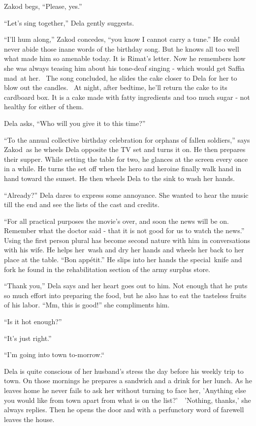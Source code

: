 \documentclass[twoside,11pt]{book}
\begin{document}
Zakod begs, ``Please, yes.'' 

``Let's sing together,'' Dela gently suggests. 

``I'll hum along,'' Zakod concedes, ``you know I cannot carry a
tune.'' He could never abide those inane words of the birthday song. But he knows all too well what made
him so amenable today. It is Rimat's letter. Now he remembers how she was always teasing him about his tone-deaf
singing - which would get Saffia mad\ at her. \ The song concluded, he slides the cake closer to Dela for her to blow
out the candles. \ At night, after bedtime, he'll return the cake to its cardboard box. It is a cake made with fatty
ingredients and too much sugar - not healthy for either of them.

Dela asks, ``Who will you give it to this time?'' 

``To the annual collective birthday celebration for orphans of fallen soldiers,'' says
Zakod~as he wheels Dela opposite the TV set and turns it on. He then prepares their supper. While setting the table for
two, he glances at the screen every once in a while. He turns the set off when the hero and heroine finally walk hand
in hand toward the sunset. He then wheels Dela to the sink to wash her hands.\ \ 

``Already?'' Dela dares to express some annoyance. She wanted to hear the music till the end
and see the lists of the cast and credits. 

``For all practical purposes the movie's over, and soon the news will be on. Remember what the doctor said
- that it is not good for us to watch the news.'' Using the first person plural has become second nature
with him in conversations with his wife. He helps her~wash and dry her hands and wheels her back to her place at the
table. ``Bon app\'etit.'' He slips into her hands the special~knife and fork he found in the
rehabilitation section of the army surplus store. 

``Thank you,'' Dela says and her heart goes out to him. Not enough that he puts so much effort
into preparing the food, but he also has to eat the tasteless fruits of his labor. ``Mm, this is good!''
she compliments him. 

``Is it hot enough?'' 

``It's just right.'' 

``I'm going into town to-morrow.``\ 

Dela is quite conscious of her husband's stress the day before his weekly trip to town. On those mornings he prepares a
sandwich and a drink for her lunch. As he leaves home he never fails to ask her without turning to face her, 'Anything
else you would like from town apart from what is on the list?'\ \ {}'Nothing, thanks,' she always replies. Then he
opens the door and with a perfunctory word of farewell leaves the house. 
\end{document}
